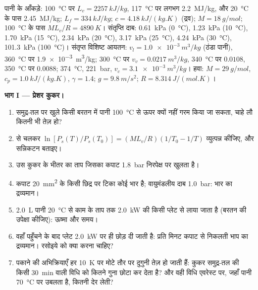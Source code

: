 \begin{problem}
\label{pb:b1:phase-changes:1}
पानी के आँकड़े: \qty{100}{\degreeCelsius} पर $L_v = \qty{2257}{kJ/kg}$,
\qty{117}{\degreeCelsius} पर लगभग \qty{2.2}{MJ/kg}, और \qty{20}{\degreeCelsius}
के पास \qty{2.45}{MJ/kg}; $L_f = \qty{334}{kJ/kg}$; $c = \qty{4.18}{kJ/(kg.K)}$
(द्रव); $M = \qty{18}{g/mol}$; \qty{100}{\degreeCelsius} के पास
$ML_v/R = \qty{4890}{K}$। संतृप्ति दाब: \qty{0.61}{kPa}
(\qty{0}{\degreeCelsius}), \qty{1.23}{kPa} (\qty{10}{\degreeCelsius}), \qty{1.70}{kPa} (\qty{15}{\degreeCelsius}),
\qty{2.34}{kPa} (\qty{20}{\degreeCelsius}), \qty{3.17}{kPa} (\qty{25}{\degreeCelsius}), \qty{4.24}{kPa}
(\qty{30}{\degreeCelsius}), \qty{101.3}{kPa} (\qty{100}{\degreeCelsius})।
संतृप्त विशिष्ट आयतन: $v_l = \qty{1.0e-3}{m^3/kg}$ (ठंडा पानी),
\qty{360}{\degreeCelsius} पर \qty{1.9e-3}{m^3/kg}; \qty{300}{\degreeCelsius}
पर $v_v = \qty{0.0217}{m^3/kg}$, \qty{340}{\degreeCelsius} पर $0.0108$,
\qty{350}{\degreeCelsius} पर $0.0088$;  \qty{374}{\degreeCelsius},
\qty{221}{bar}, $v_c = \qty{3.1e-3}{m^3/kg}$। हवा: $M = \qty{29}{g/mol}$, $c_p =
\qty{1.0}{kJ/(kg.K)}$, $\gamma = 1.4$; $g = \qty{9.8}{m/s^2}$; $R =
\qty{8.314}{J/(mol.K)}$।

\medskip
\noindent\textbf{भाग I --- प्रेशर कुकर।}
\begin{enumerate}
  \item समुद्र-तल पर खुले किसी बरतन में पानी \qty{100}{\degreeCelsius} से
        ऊपर क्यों नहीं गरम किया जा सकता, चाहे लौ कितनी भी तेज़ हो?
  \item {} से चलकर
        $\ln[P_s(T)/P_s(T_0)] = (ML_v/R)(1/T_0 - 1/T)$ व्युत्पन्न कीजिए, और
        सन्निकटन बताइए।
  \item उस कुकर के भीतर का ताप जिसका कपाट \qty{1.8}{bar} निरपेक्ष पर खुलता
        है।
  \item कपाट \qty{20}{mm^2} के किसी छिद्र पर टिका कोई भार है; वायुमंडलीय
        दाब \qty{1.0}{bar}: भार का द्रव्यमान।
  \item \qty{2.0}{L} पानी \qty{20}{\degreeCelsius} से काम के ताप तक
        \qty{2.0}{kW} की किसी प्लेट से लाया जाता है (बरतन की उपेक्षा
        कीजिए): ऊष्मा और समय।
  \item वहाँ पहुँचने के बाद प्लेट \qty{2.0}{kW} पर ही छोड़ दी जाती है:
        प्रति मिनट कपाट से निकलती भाप का द्रव्यमान। रसोइये को क्या करना
        चाहिए?
  \item पकाने की अभिक्रियाएँ हर \qty{10}{K} पर मोटे तौर पर दुगुनी तेज़ हो
        जाती हैं: कुकर समुद्र-तल की किसी \qty{30}{min} वाली विधि को कितने
        गुना छोटा कर देता है? और वही विधि एवरेस्ट पर, जहाँ पानी
        \qty{70}{\degreeCelsius} पर उबलता है, कितनी देर लेती?
\end{enumerate}


\end{problem}

